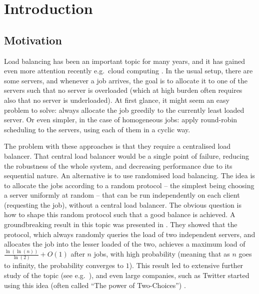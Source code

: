 \chapter{Introduction}\label{introduction}

\ifpdf
    \graphicspath{{Chapter1/Figs/Raster/}{Chapter1/Figs/PDF/}{Chapter1/Figs/}}
\else
    \graphicspath{{Chapter1/Figs/Vector/}{Chapter1/Figs/}}
\fi


\section{Motivation}

Load balancing has been an important topic for many years, and it has gained even more attention recently e.g.\ cloud computing \cite{mishra2020cloud}. In the usual setup, there are some servers, and whenever a job arrives, the goal is to allocate it to one of the servers such that no server is overloaded (which at high burden often requires also that no server is underloaded). At first glance, it might seem an easy problem to solve: always allocate the job greedily to the currently least loaded server. Or even simpler, in the case of homogeneous jobs: apply round-robin scheduling to the servers, using each of them in a cyclic way. 

The problem with these approaches is that they require a centralised load balancer. That central load balancer would be a single point of failure, reducing the robustness of the whole system, and decreasing performance due to its sequential nature. An alternative is to use randomised load balancing. The idea is to allocate the jobs according to a random protocol -- the simplest being choosing a server uniformly at random -- that can be run independently on each client (requesting the job), without a central load balancer. The obvious question is how to shape this random protocol such that a good balance is achieved. A groundbreaking result in this topic was presented in \cite{azar1999twochoice}. They showed that the \TwoChoice protocol, which always randomly queries the load of two independent servers, and allocates the job into the lesser loaded of the two, achieves a maximum load of $\frac{\ln(\ln(n))}{\ln(2)} + O(1)$ after $n$ jobs, with high probability (meaning that as $n$ goes to infinity, the probability converges to $1$). This result led to extensive further study of the topic (see e.g.\ \cite{richa2001surveytwochoice}), and even large companies, such as Twitter started using this idea (often called ``The power of Two-Choices'') \cite{anderson2019twitter}.


